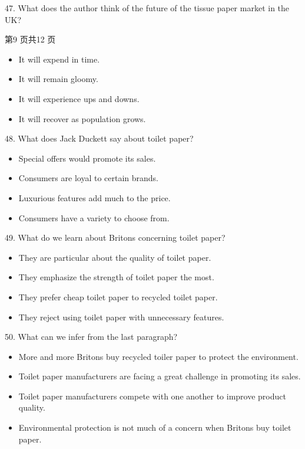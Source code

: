 \documentclass[UTF8,11pt]{ctexart}
\begin{document}
47. What does the author think of the future of the tissue paper market in the UK?


第9 页共12 页


\begin{itemize}[leftmargin=2em,itemsep=.2em,topsep=.4em]\item[A.] It will expend in time.
\item[B.] It will remain gloomy.
\item[C.] It will experience ups and downs.
\item[D.] It will recover as population grows.
\end{itemize}

48. What does Jack Duckett say about toilet paper?


\begin{itemize}[leftmargin=2em,itemsep=.2em,topsep=.4em]\item[A.] Special offers would promote its sales.
\item[B.] Consumers are loyal to certain brands.
\item[C.] Luxurious features add much to the price.
\item[D.] Consumers have a variety to choose from.
\end{itemize}

49. What do we learn about Britons concerning toilet paper?


\begin{itemize}[leftmargin=2em,itemsep=.2em,topsep=.4em]\item[A.] They are particular about the quality of toilet paper.
\item[B.] They emphasize the strength of toilet paper the most.
\item[C.] They prefer cheap toilet paper to recycled toilet paper.
\item[D.] They reject using toilet paper with unnecessary features.
\end{itemize}

50. What can we infer from the last paragraph?


\begin{itemize}[leftmargin=2em,itemsep=.2em,topsep=.4em]\item[A.] More and more Britons buy recycled toiler paper to protect the environment.
\item[B.] Toilet paper manufacturers are facing a great challenge in promoting its sales.
\item[C.] Toilet paper manufacturers compete with one another to improve product quality.
\item[D.] Environmental protection is not much of a concern when Britons buy toilet paper.
\end{itemize}
\end{document}
